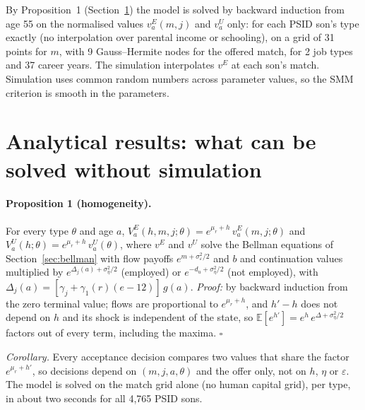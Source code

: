 \documentclass[11pt]{article}
\newcommand{\E}{\mathbb{E}}
\newcommand{\1}{\mathbf{1}}
\begin{document}
By Proposition~1 (Section~\ref{sec:analytic}) the model is solved by backward induction from age 55 on the
normalised values $v^E_a(m, j)$ and $v^U_a$ only: for each PSID son's type exactly (no interpolation over parental
income or schooling), on a grid of 31 points for $m$, with 9 Gauss--Hermite nodes for the offered match, for 2 job types
and 37 career years. The simulation interpolates $v^E$ at each son's match. Simulation uses common random numbers across parameter values, so
the SMM criterion is smooth in the parameters.


\section{Analytical results: what can be solved without simulation}\label{sec:analytic}

\paragraph{Proposition 1 (homogeneity).} For every type $\theta$ and age $a$, $V^E_a(h, m, j; \theta) = e^{\mu_r + h}\,
v^E_a(m, j; \theta)$ and $V^U_a(h; \theta) = e^{\mu_r + h}\, v^U_a(\theta)$, where $v^E$ and $v^U$ solve the Bellman
equations of Section~\ref{sec:bellman} with flow payoffs $e^{m + \sigma_\varepsilon^2/2}$ and $b$ and continuation values
multiplied by $e^{\Delta_j(a) + \sigma_\eta^2/2}$ (employed) or $e^{-d_u + \sigma_\eta^2/2}$ (not employed), with
$\Delta_j(a) = [\gamma_j + \gamma_1(r)(e - 12)]\,g(a)$. \emph{Proof:} by backward induction from the zero terminal value;
flows are proportional to $e^{\mu_r + h}$, and $h' - h$ does not depend on $h$ and its shock is independent of the state,
so $\E[e^{h'}] = e^{h}\, e^{\Delta + \sigma_\eta^2/2}$ factors out of every term, including the maxima. $\square$

\emph{Corollary.} Every acceptance decision compares two values that share the factor $e^{\mu_r + h'}$, so decisions
depend on $(m, j, a, \theta)$ and the offer only, not on $h$, $\eta$ or $\varepsilon$. The model is solved on the match
grid alone (no human capital grid), per type, in about two seconds for all 4,765 PSID sons.
\end{document}
